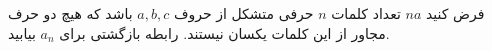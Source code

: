 \EXERCISE
فرض کنید 
$na$
تعداد کلمات 
$n$
 حرفی متشکل از حروف 
$a, b, c$
 باشد که هیچ دو حرف مجاور از این کلمات یکسان نیستند. رابطه بازگشتی برای
$a_n$
بیابید.